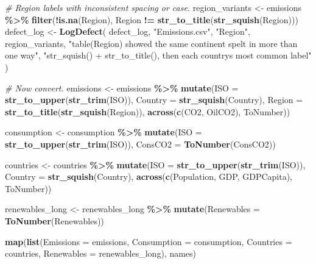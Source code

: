 \documentclass[
]{article}
\newenvironment{Shaded}{\begin{snugshade}}{\end{snugshade}}
\newcommand{\AttributeTok}[1]{\textcolor[rgb]{0.13,0.29,0.53}{#1}}
\newcommand{\CommentTok}[1]{\textcolor[rgb]{0.56,0.35,0.01}{\textit{#1}}}
\newcommand{\FunctionTok}[1]{\textcolor[rgb]{0.13,0.29,0.53}{\textbf{#1}}}
\newcommand{\NormalTok}[1]{#1}
\newcommand{\OtherTok}[1]{\textcolor[rgb]{0.56,0.35,0.01}{#1}}
\newcommand{\SpecialCharTok}[1]{\textcolor[rgb]{0.81,0.36,0.00}{\textbf{#1}}}
\newcommand{\StringTok}[1]{\textcolor[rgb]{0.31,0.60,0.02}{#1}}
\begin{document}
\begin{Shaded}
\begin{Highlighting}[]
\CommentTok{\# Region labels with inconsistent spacing or case.}
\NormalTok{region\_variants }\OtherTok{\textless{}{-}}\NormalTok{ emissions }\SpecialCharTok{\%\textgreater{}\%}
  \FunctionTok{filter}\NormalTok{(}\SpecialCharTok{!}\FunctionTok{is.na}\NormalTok{(Region), Region }\SpecialCharTok{!=} \FunctionTok{str\_to\_title}\NormalTok{(}\FunctionTok{str\_squish}\NormalTok{(Region)))}
\NormalTok{defect\_log }\OtherTok{\textless{}{-}} \FunctionTok{LogDefect}\NormalTok{(}
\NormalTok{  defect\_log, }\StringTok{"Emissions.csv"}\NormalTok{, }\StringTok{"Region"}\NormalTok{, region\_variants,}
  \StringTok{"table(Region) showed the same continent spelt in more than one way"}\NormalTok{,}
  \StringTok{"str\_squish() + str\_to\_title(), then each country\textquotesingle{}s most common label"}
\NormalTok{)}

\CommentTok{\# Now convert.}
\NormalTok{emissions }\OtherTok{\textless{}{-}}\NormalTok{ emissions }\SpecialCharTok{\%\textgreater{}\%}
  \FunctionTok{mutate}\NormalTok{(}\AttributeTok{ISO =} \FunctionTok{str\_to\_upper}\NormalTok{(}\FunctionTok{str\_trim}\NormalTok{(ISO)),}
         \AttributeTok{Country =} \FunctionTok{str\_squish}\NormalTok{(Country),}
         \AttributeTok{Region =} \FunctionTok{str\_to\_title}\NormalTok{(}\FunctionTok{str\_squish}\NormalTok{(Region)),}
         \FunctionTok{across}\NormalTok{(}\FunctionTok{c}\NormalTok{(CO2, OilCO2), ToNumber))}

\NormalTok{consumption }\OtherTok{\textless{}{-}}\NormalTok{ consumption }\SpecialCharTok{\%\textgreater{}\%}
  \FunctionTok{mutate}\NormalTok{(}\AttributeTok{ISO =} \FunctionTok{str\_to\_upper}\NormalTok{(}\FunctionTok{str\_trim}\NormalTok{(ISO)), }\AttributeTok{ConsCO2 =} \FunctionTok{ToNumber}\NormalTok{(ConsCO2))}

\NormalTok{countries }\OtherTok{\textless{}{-}}\NormalTok{ countries }\SpecialCharTok{\%\textgreater{}\%}
  \FunctionTok{mutate}\NormalTok{(}\AttributeTok{ISO =} \FunctionTok{str\_to\_upper}\NormalTok{(}\FunctionTok{str\_trim}\NormalTok{(ISO)),}
         \AttributeTok{Country =} \FunctionTok{str\_squish}\NormalTok{(Country),}
         \FunctionTok{across}\NormalTok{(}\FunctionTok{c}\NormalTok{(Population, GDP, GDPCapita), ToNumber))}

\NormalTok{renewables\_long }\OtherTok{\textless{}{-}}\NormalTok{ renewables\_long }\SpecialCharTok{\%\textgreater{}\%}
  \FunctionTok{mutate}\NormalTok{(}\AttributeTok{Renewables =} \FunctionTok{ToNumber}\NormalTok{(Renewables))}

\FunctionTok{map}\NormalTok{(}\FunctionTok{list}\NormalTok{(}\AttributeTok{Emissions =}\NormalTok{ emissions, }\AttributeTok{Consumption =}\NormalTok{ consumption,}
         \AttributeTok{Countries =}\NormalTok{ countries, }\AttributeTok{Renewables =}\NormalTok{ renewables\_long), names)}
\end{Highlighting}
\end{Shaded}
\end{document}
